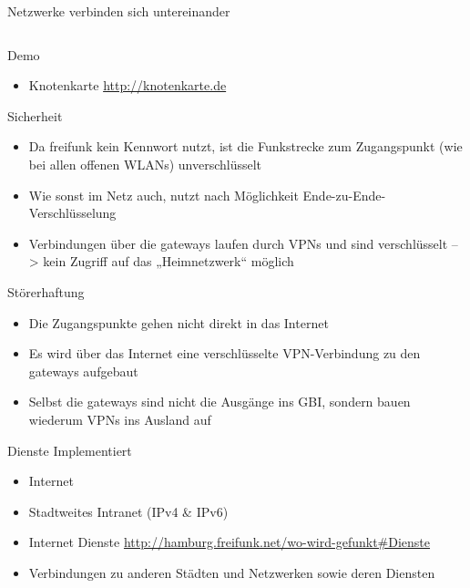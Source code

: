 \documentclass[c]{beamer}
\begin{document}
\begin{frame}{Netzwerke verbinden sich untereinander}
\begin{columns}[c]
\begin{column}[r]{.5\textwidth}
{{}}
		\end{column}
	\end{columns}
\end{frame}


\begin{frame}{Demo}
	\begin{itemize}
		\item Knotenkarte \href{http://knotenkarte.de}{http://knotenkarte.de}
	\end{itemize}
\end{frame}




\begin{frame}{Sicherheit}
	\begin{itemize}
		\item Da freifunk kein Kennwort nutzt, ist die Funkstrecke zum Zugangspunkt (wie bei allen offenen WLANs) unverschlüsselt
		\item Wie sonst im Netz auch, nutzt nach Möglichkeit Ende-zu-Ende-Verschlüsselung
		\item Verbindungen über die gateways laufen durch VPNs und sind verschlüsselt --> kein Zugriff auf das „Heimnetzwerk“ möglich
	\end{itemize}
\end{frame}


\begin{frame}{Störerhaftung}
	\begin{itemize}
		\item Die Zugangspunkte gehen nicht direkt in das Internet
		\item Es wird über das Internet eine verschlüsselte VPN-Verbindung zu den gateways aufgebaut
		\item Selbst die gateways sind nicht die Ausgänge ins GBI, sondern bauen wiederum VPNs ins Ausland auf
	\end{itemize}
\end{frame}


\begin{frame}{Dienste}
	Implementiert
	\begin{itemize}
		\item Internet
		\item Stadtweites Intranet (IPv4 \& IPv6)
		\item Internet Dienste \href{http://hamburg.freifunk.net/wo-wird-gefunkt\#Dienste}{http://hamburg.freifunk.net/wo-wird-gefunkt\#Dienste}
		\item Verbindungen zu anderen Städten und Netzwerken sowie deren Diensten
	\end{itemize}
\end{frame}
\end{document}
